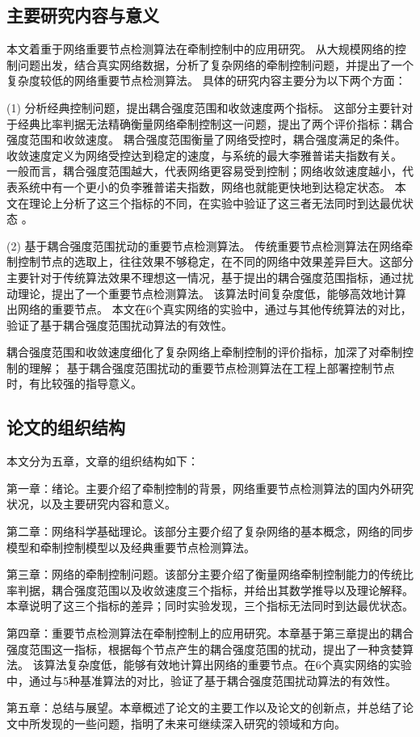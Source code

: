 \subsection{主要研究内容与意义}
本文着重于网络重要节点检测算法在牵制控制中的应用研究。
从大规模网络的控制问题出发，结合真实网络数据，分析了复杂网络的牵制控制问题，并提出了一个复杂度较低的网络重要节点检测算法。
具体的研究内容主要分为以下两个方面：

(1) 分析经典控制问题，提出耦合强度范围和收敛速度两个指标。
这部分主要针对于经典比率判据无法精确衡量网络牵制控制这一问题，提出了两个评价指标：耦合强度范围和收敛速度。
耦合强度范围衡量了网络受控时，耦合强度满足的条件。
收敛速度定义为网络受控达到稳定的速度，与系统的最大李雅普诺夫指数有关。
一般而言，耦合强度范围越大，代表网络更容易受到控制；网络收敛速度越小，代表系统中有一个更小的负李雅普诺夫指数，网络也就能更快地到达稳定状态。
本文在理论上分析了这三个指标的不同，在实验中验证了这三者无法同时到达最优状态
。

(2) 基于耦合强度范围扰动的重要节点检测算法。
传统重要节点检测算法在网络牵制控制节点的选取上，往往效果不够稳定，在不同的网络中效果差异巨大。这部分主要针对于传统算法效果不理想这一情况，基于提出的耦合强度范围指标，通过扰动理论，提出了一个重要节点检测算法。
该算法时间复杂度低，能够高效地计算出网络的重要节点。
本文在6个真实网络的实验中，通过与其他传统算法的对比，验证了基于耦合强度范围扰动算法的有效性。


耦合强度范围和收敛速度细化了复杂网络上牵制控制的评价指标，加深了对牵制控制的理解；
基于耦合强度范围扰动的重要节点检测算法在工程上部署控制节点时，有比较强的指导意义。

\subsection{论文的组织结构}
本文分为五章，文章的组织结构如下：

第一章：绪论。主要介绍了牵制控制的背景，网络重要节点检测算法的国内外研究状况，以及主要研究内容和意义。

第二章：网络科学基础理论。该部分主要介绍了复杂网络的基本概念，网络的同步模型和牵制控制模型以及经典重要节点检测算法。

第三章：网络的牵制控制问题。该部分主要介绍了衡量网络牵制控制能力的传统比率判据，耦合强度范围以及收敛速度三个指标，并给出其数学推导以及理论解释。
本章说明了这三个指标的差异；同时实验发现，三个指标无法同时到达最优状态。

第四章：重要节点检测算法在牵制控制上的应用研究。本章基于第三章提出的耦合强度范围这一指标，根据每个节点产生的耦合强度范围的扰动，提出了一种贪婪算法。
该算法复杂度低，能够有效地计算出网络的重要节点。在6个真实网络的实验中，通过与5种基准算法的对比，验证了基于耦合强度范围扰动算法的有效性。

第五章：总结与展望。本章概述了论文的主要工作以及论文的创新点，并总结了论文中所发现的一些问题，指明了未来可继续深入研究的领域和方向。

\clearpage
